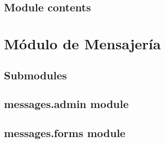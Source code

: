 \documentclass[letterpaper,10pt,spanish]{sphinxmanual}
\begin{document}
\begin{fulllineitems}
\label{medicament:medicament.views.edit_wormer}
\end{fulllineitems}


\begin{fulllineitems}
\label{medicament:medicament.views.list_vaccine}
\end{fulllineitems}


\begin{fulllineitems}
\label{medicament:medicament.views.list_wormer}
\end{fulllineitems}



\subsection{Module contents}
\label{medicament:module-medicament}\label{medicament:module-contents}

\section{Módulo de Mensajería}
\label{messages:messages-package}\label{messages::doc}

\subsection{Submodules}
\label{messages:submodules}

\subsection{messages.admin module}
\label{messages:messages-admin-module}\label{messages:module-messages.admin}

\subsection{messages.forms module}
\label{messages:messages-forms-module}\label{messages:module-messages.forms}
\end{document}

